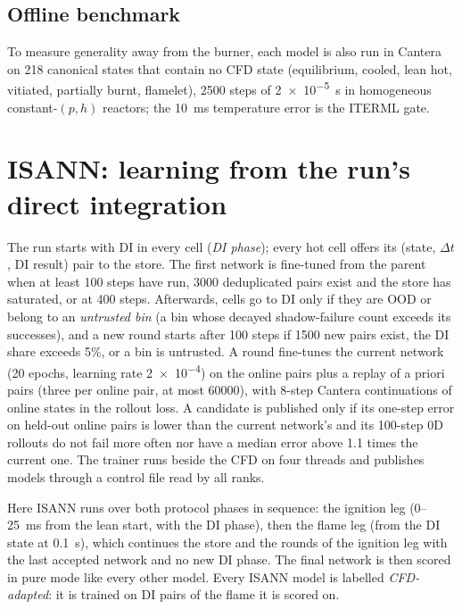 \documentclass[preprint,review,12pt]{elsarticle}
\begin{document}
\subsection{Offline benchmark}
To measure generality away from the burner, each model is also run in Cantera on 218 canonical states that
contain no CFD state (equilibrium, cooled, lean hot, vitiated, partially burnt, flamelet), 2500 steps of
\SI{2e-5}{s} in homogeneous constant-$(p,h)$ reactors; the 10~ms temperature error is the ITERML gate.

\section{ISANN: learning from the run's direct integration}
\label{sec:isann}
The run starts with DI in every cell (\emph{DI phase}); every hot cell offers its (state, $\Delta t$, DI
result) pair to the store. The first network is fine-tuned from the parent when at least 100 steps have run,
\num{3000} deduplicated pairs exist and the store has saturated, or at 400 steps. Afterwards, cells go to DI
only if they are OOD or belong to an \emph{untrusted bin} (a bin whose decayed shadow-failure count exceeds
its successes), and a new round starts after 100 steps if \num{1500} new pairs exist, the DI share exceeds
5\%, or a bin is untrusted. A round fine-tunes the current network (20 epochs, learning rate \num{2e-4}) on
the online pairs plus a replay of a priori pairs (three per online pair, at most \num{60000}), with 8-step
Cantera continuations of online states in the rollout loss. A candidate is published only if its one-step
error on held-out online pairs is lower than the current network's and its 100-step 0D rollouts do not fail
more often nor have a median error above 1.1 times the current one. The trainer runs beside the CFD on four
threads and publishes models through a control file read by all ranks.

Here ISANN runs over both protocol phases in sequence: the ignition leg (0--25~ms from the lean start,
with the DI phase), then the flame leg (from the DI state at 0.1~s), which continues the store and the
rounds of the ignition leg with the last accepted network and no new DI phase. The final network is then
scored in pure mode like every other model. Every ISANN model is labelled \emph{CFD-adapted}: it is trained
on DI pairs of the flame it is scored on.

\end{document}
